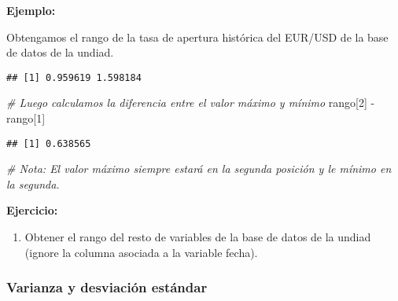 \documentclass[
]{book}
\newenvironment{Shaded}{\begin{snugshade}}{\end{snugshade}}
\newcommand{\AttributeTok}[1]{\textcolor[rgb]{0.77,0.63,0.00}{#1}}
\newcommand{\CommentTok}[1]{\textcolor[rgb]{0.56,0.35,0.01}{\textit{#1}}}
\newcommand{\DecValTok}[1]{\textcolor[rgb]{0.00,0.00,0.81}{#1}}
\newcommand{\FunctionTok}[1]{\textcolor[rgb]{0.00,0.00,0.00}{#1}}
\newcommand{\NormalTok}[1]{#1}
\newcommand{\SpecialCharTok}[1]{\textcolor[rgb]{0.00,0.00,0.00}{#1}}
\providecommand{\tightlist}{%
  \setlength{\itemsep}{0pt}\setlength{\parskip}{0pt}}
\begin{document}
\textbf{Ejemplo:}

Obtengamos el rango de la tasa de apertura histórica del EUR/USD de la base de datos de la undiad.

\begin{Shaded}
\end{Shaded}

\begin{verbatim}
## [1] 0.959619 1.598184
\end{verbatim}

\begin{Shaded}
\begin{Highlighting}[]
\CommentTok{\# Luego calculamos la diferencia entre el valor máximo y mínimo}
\NormalTok{rango[}\DecValTok{2}\NormalTok{] }\SpecialCharTok{{-}}\NormalTok{ rango[}\DecValTok{1}\NormalTok{]}
\end{Highlighting}
\end{Shaded}

\begin{verbatim}
## [1] 0.638565
\end{verbatim}

\begin{Shaded}
\begin{Highlighting}[]
\CommentTok{\# Nota: El valor máximo siempre estará en la segunda posición y le mínimo en la segunda.}
\end{Highlighting}
\end{Shaded}

\textbf{Ejercicio:}

\begin{enumerate}
\def\labelenumi{\arabic{enumi}.}
\tightlist
\item
  Obtener el rango del resto de variables de la base de datos de la undiad (ignore la columna asociada a la variable fecha).
\end{enumerate}

\hypertarget{varianza-y-desviaciuxf3n-estuxe1ndar}{%
\subsubsection*{Varianza y desviación estándar}\label{varianza-y-desviaciuxf3n-estuxe1ndar}}
\end{document}
